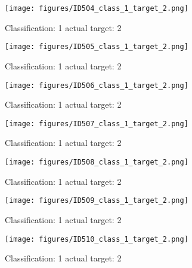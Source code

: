 \begin{figure}[h!]
\begin{center}
\texttt{[image: figures/ID504\_class\_1\_target\_2.png]}
\end{center}
\caption{ Classification: 1 actual target: 2}
\label{fig:ID504_class_1_target_2}
\end{figure}
\begin{figure}[h!]
\begin{center}
\texttt{[image: figures/ID505\_class\_1\_target\_2.png]}
\end{center}
\caption{ Classification: 1 actual target: 2}
\label{fig:ID505_class_1_target_2}
\end{figure}
\begin{figure}[h!]
\begin{center}
\texttt{[image: figures/ID506\_class\_1\_target\_2.png]}
\end{center}
\caption{ Classification: 1 actual target: 2}
\label{fig:ID506_class_1_target_2}
\end{figure}
\begin{figure}[h!]
\begin{center}
\texttt{[image: figures/ID507\_class\_1\_target\_2.png]}
\end{center}
\caption{ Classification: 1 actual target: 2}
\label{fig:ID507_class_1_target_2}
\end{figure}
\begin{figure}[h!]
\begin{center}
\texttt{[image: figures/ID508\_class\_1\_target\_2.png]}
\end{center}
\caption{ Classification: 1 actual target: 2}
\label{fig:ID508_class_1_target_2}
\end{figure}
\begin{figure}[h!]
\begin{center}
\texttt{[image: figures/ID509\_class\_1\_target\_2.png]}
\end{center}
\caption{ Classification: 1 actual target: 2}
\label{fig:ID509_class_1_target_2}
\end{figure}
\begin{figure}[h!]
\begin{center}
\texttt{[image: figures/ID510\_class\_1\_target\_2.png]}
\end{center}
\caption{ Classification: 1 actual target: 2}
\label{fig:ID510_class_1_target_2}
\end{figure}
